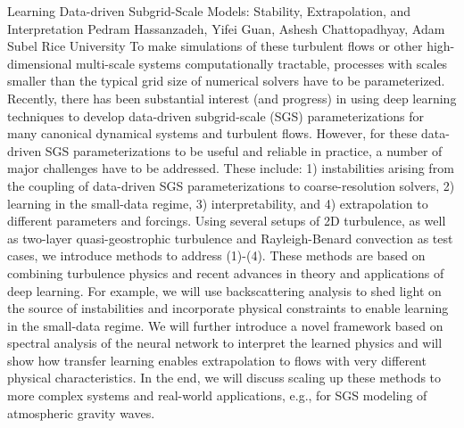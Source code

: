 \begin{addmargin}[2em]{0em}
\vspace{1.5ex}
\abs
{Learning Data-driven Subgrid-Scale Models: Stability, Extrapolation, and Interpretation}
{Pedram Hassanzadeh, Yifei Guan, Ashesh Chattopadhyay, Adam Subel}
{Rice University}
{To make simulations of these turbulent flows or other high-dimensional multi-scale systems computationally tractable, processes with scales smaller than the typical grid size of numerical solvers have to be parameterized. Recently, there has been substantial interest (and progress) in using deep learning techniques to develop data-driven subgrid-scale (SGS) parameterizations for many canonical dynamical systems and turbulent flows. However, for these data-driven SGS parameterizations to be useful and reliable in practice, a number of major challenges have to be addressed. These include: 1) instabilities arising from the coupling of data-driven SGS parameterizations to coarse-resolution solvers, 2) learning in the small-data regime, 3) interpretability, and 4) extrapolation to different parameters and forcings. Using several setups of 2D turbulence, as well as two-layer quasi-geostrophic turbulence and Rayleigh-Benard convection as test cases, we introduce methods to address (1)-(4). These methods are based on combining turbulence physics and recent advances in theory and applications of deep learning. For example, we will use backscattering analysis to shed light on the source of instabilities and incorporate physical constraints to enable learning in the small-data regime. We will further introduce a novel framework based on spectral analysis of the neural network to interpret the learned physics and will show how transfer learning enables extrapolation to flows with very different physical characteristics. In the end, we will discuss scaling up these methods to more complex systems and real-world applications, e.g., for SGS modeling of atmospheric gravity waves.}



\end{addmargin}
